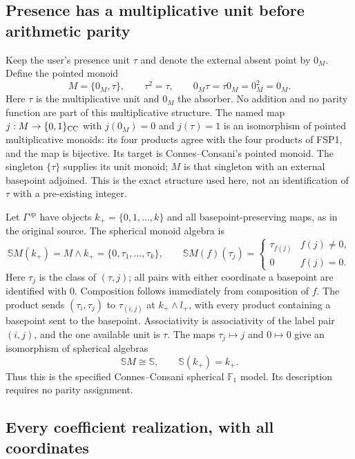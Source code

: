 \subsection{Presence has a multiplicative unit before arithmetic parity}

Keep the user's presence unit $\tau$ and denote the external
absent point by $0_M$. Define the pointed monoid
\begin{equation}\tag{FSP1}
M=\{0_M,\tau\},\qquad
\tau^2=\tau,\qquad
0_M\tau=\tau0_M=0_M^2=0_M.
\end{equation}
Here $\tau$ is the multiplicative unit and $0_M$
the absorber. No addition and no parity function are part of
this multiplicative structure. The named map
$j:M\to\{0,1\}_{\rm CC}$ with $j(0_M)=0$ and $j(\tau)=1$
is an isomorphism of pointed multiplicative monoids: its four
products agree with the four products of FSP1, and the map is
bijective. Its target is Connes--Consani's pointed monoid.
The singleton $\{\tau\}$ supplies its
unit monoid; $M$ is that singleton with an external basepoint
adjoined. This is the exact structure used here, not an
identification of $\tau$ with a pre-existing integer.

Let $\Gamma^{\mathrm{op}}$ have objects
$k_+=\{0,1,\ldots,k\}$ and all basepoint-preserving maps,
as in the original source. The spherical monoid algebra is
\begin{equation}\tag{FSP2}
\mathbb S M(k_+)=M\wedge k_+
=\{0,\tau_1,\ldots,\tau_k\},\qquad
\mathbb S M(f)(\tau_j)=
\begin{cases}\tau_{f(j)}&f(j)\ne0,\\0&f(j)=0.\end{cases}
\end{equation}
Here $\tau_j$ is the class of $(\tau,j)$; all pairs
with either coordinate a basepoint are identified with $0$.
Composition follows immediately from composition of $f$.
The product sends $(\tau_i,\tau_j)$ to $\tau_{(i,j)}$ at
$k_+\wedge l_+$, with every product containing a basepoint
sent to the basepoint. Associativity is associativity of the
label pair $(i,j)$, and the one available unit is
$\tau$. The maps $\tau_j\mapsto j$ and $0\mapsto0$
give an isomorphism of spherical algebras
\begin{equation}\tag{FSP3}
\mathbb S M\cong\mathbb S,\qquad\mathbb S(k_+)=k_+.
\end{equation}
Thus this is the specified Connes--Consani spherical
$\mathbb F_1$ model. Its description requires no parity assignment.

\subsection{Every coefficient realization, with all coordinates}

